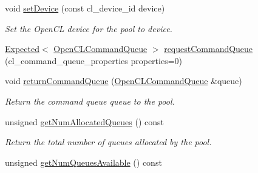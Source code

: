 \begin{DoxyCompactItemize}
\mbox{\label{classglow_1_1runtime_1_1_open_c_l_command_queue_pool_ae86ba1f4173952866531d18bdd2052c1}} 
void \hyperlink{classglow_1_1runtime_1_1_open_c_l_command_queue_pool_ae86ba1f4173952866531d18bdd2052c1}{set\+Device} (const cl\+\_\+device\+\_\+id device)
\begin{DoxyCompactList}\small\item\em Set the Open\+CL device for the pool to {\ttfamily device}. \end{DoxyCompactList}\item 
\hyperlink{classglow_1_1detail_1_1_glow_expected}{Expected}$<$ \hyperlink{structglow_1_1runtime_1_1_open_c_l_command_queue}{Open\+C\+L\+Command\+Queue} $>$ \hyperlink{classglow_1_1runtime_1_1_open_c_l_command_queue_pool_a2486ee8c7684f5a6fc420fbb19c3166f}{request\+Command\+Queue} (cl\+\_\+command\+\_\+queue\+\_\+properties properties=0)
\item 
\mbox{\label{classglow_1_1runtime_1_1_open_c_l_command_queue_pool_af68ee89be676152c73d3c54325958528}} 
void \hyperlink{classglow_1_1runtime_1_1_open_c_l_command_queue_pool_af68ee89be676152c73d3c54325958528}{return\+Command\+Queue} (\hyperlink{structglow_1_1runtime_1_1_open_c_l_command_queue}{Open\+C\+L\+Command\+Queue} \&queue)
\begin{DoxyCompactList}\small\item\em Return the command queue {\ttfamily queue} to the pool. \end{DoxyCompactList}\item 
\mbox{\label{classglow_1_1runtime_1_1_open_c_l_command_queue_pool_a563432249a3ab3d751f378edd82da085}} 
unsigned \hyperlink{classglow_1_1runtime_1_1_open_c_l_command_queue_pool_a563432249a3ab3d751f378edd82da085}{get\+Num\+Allocated\+Queues} () const
\begin{DoxyCompactList}\small\item\em Return the total number of queues allocated by the pool. \end{DoxyCompactList}\item 
\mbox{\label{classglow_1_1runtime_1_1_open_c_l_command_queue_pool_a89f72e6cfc197123f4dd322d1073d3b4}} 
unsigned \hyperlink{classglow_1_1runtime_1_1_open_c_l_command_queue_pool_a89f72e6cfc197123f4dd322d1073d3b4}{get\+Num\+Queues\+Available} () const

\end{DoxyCompactItemize}
